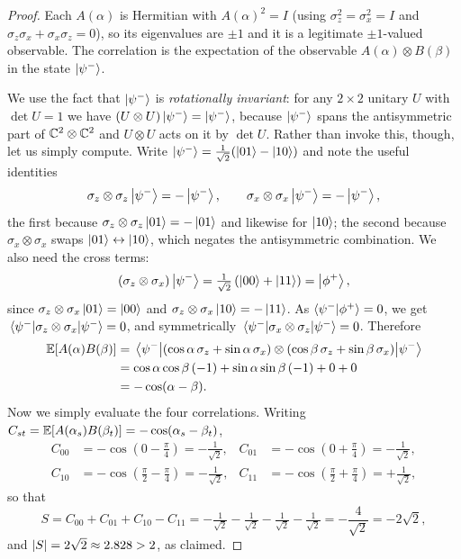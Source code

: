 \documentclass[a4paper]{scrartcl}
\begin{document}
\begin{proof}
	Each $A(\alpha)$ is Hermitian with $A(\alpha)^2 = I$ (using $\sigma_z^2 = \sigma_x^2 = I$ and $\sigma_z\sigma_x + \sigma_x\sigma_z = 0$), so its eigenvalues are $\pm1$ and it is a legitimate $\pm1$-valued observable. The correlation is the expectation of the observable $A(\alpha)\otimes B(\beta)$ in the state $\ket{\psi^-}$.

	We use the fact that $\ket{\psi^-}$ is \emph{rotationally invariant}: for any $2\times2$ unitary $U$ with $\det U = 1$ we have $(U \otimes U)\ket{\psi^-} = \ket{\psi^-}$, because $\ket{\psi^-}$ spans the antisymmetric part of $\mathbb{C}^2\otimes\mathbb{C}^2$ and $U \otimes U$ acts on it by $\det U$. Rather than invoke this, though, let us simply compute. Write $\ket{\psi^-} = \tfrac1{\sqrt2}(\ket{01}-\ket{10})$ and note the useful identities
	$$\sigma_z\otimes\sigma_z\ket{\psi^-} = -\ket{\psi^-}, \qquad \sigma_x\otimes\sigma_x\ket{\psi^-} = -\ket{\psi^-},$$
	the first because $\sigma_z\otimes\sigma_z\ket{01} = -\ket{01}$ and likewise for $\ket{10}$; the second because $\sigma_x\otimes\sigma_x$ swaps $\ket{01}\leftrightarrow\ket{10}$, which negates the antisymmetric combination. We also need the cross terms:
	$$\left(\sigma_z\otimes\sigma_x\right)\ket{\psi^-} = \tfrac1{\sqrt2}\left(\ket{00} + \ket{11}\right) = \ket{\phi^+},$$
	since $\sigma_z\otimes\sigma_x\ket{01} = \ket{00}$ and $\sigma_z\otimes\sigma_x\ket{10} = -\ket{11}$. As $\ip{\psi^-}{\phi^+} = 0$, we get $\mel{\psi^-}{\sigma_z\otimes\sigma_x}{\psi^-} = 0$, and symmetrically $\mel{\psi^-}{\sigma_x\otimes\sigma_z}{\psi^-} = 0$. Therefore
	\begin{align*}
		\mathbb{E}\!\left[A(\alpha)B(\beta)\right] &= \mel{\psi^-}{\left(\cos\alpha\,\sigma_z + \sin\alpha\,\sigma_x\right)\otimes\left(\cos\beta\,\sigma_z+\sin\beta\,\sigma_x\right)}{\psi^-}\\
		&= \cos\alpha\cos\beta\,(-1) + \sin\alpha\sin\beta\,(-1) + 0 + 0 \\
		&= -\cos(\alpha-\beta).
	\end{align*}
	Now we simply evaluate the four correlations. Writing $C_{st} = \mathbb{E}[A(\alpha_s)B(\beta_t)] = -\cos(\alpha_s - \beta_t)$,
	\begin{align*}
		C_{00} &= -\cos\!\left(0 - \tfrac\pi4\right) = -\tfrac{1}{\sqrt2}, &
		C_{01} &= -\cos\!\left(0 + \tfrac\pi4\right) = -\tfrac1{\sqrt2},\\
		C_{10} &= -\cos\!\left(\tfrac\pi2-\tfrac\pi4\right) = -\tfrac1{\sqrt2}, &
		C_{11} &= -\cos\!\left(\tfrac\pi2+\tfrac\pi4\right) = +\tfrac1{\sqrt2},
	\end{align*}
	so that
	$$S = C_{00}+C_{01}+C_{10}-C_{11} = -\tfrac{1}{\sqrt2}-\tfrac1{\sqrt2}-\tfrac1{\sqrt2}-\tfrac1{\sqrt2} = -\frac{4}{\sqrt2} = -2\sqrt2,$$
	and $\lvert S\rvert = 2\sqrt2 \approx 2.828 > 2$, as claimed.
\end{proof}
\end{document}
